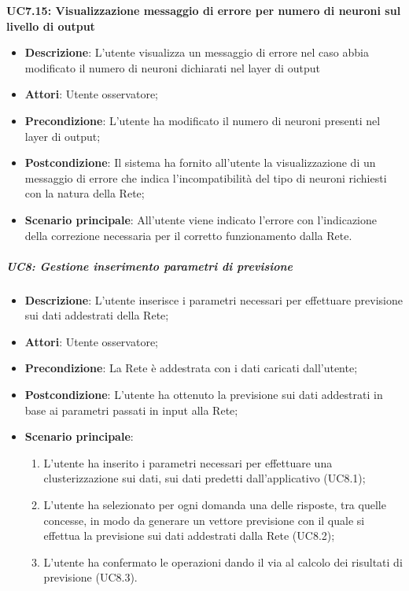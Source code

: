 \textbf{UC7.15: Visualizzazione messaggio di errore per numero di neuroni sul livello di output}\mbox{}
\label{UC7.15: Visualizzazione messaggio di errore per numero di neuroni sul livello di output}
\noindent
\begin{itemize}
\item \textbf{Descrizione}: L'utente visualizza un messaggio di errore nel caso abbia modificato il numero di neuroni dichiarati nel layer di output
\item \textbf{Attori}: Utente osservatore;
\item \textbf{Precondizione}: L'utente ha modificato il numero di neuroni presenti nel layer di output;
\item \textbf{Postcondizione}: Il sistema ha fornito all'utente la visualizzazione di un messaggio di errore che indica  l'incompatibilit\`a del tipo di neuroni richiesti con la natura della Rete;
\item \textbf{Scenario principale}: All'utente viene indicato l'errore con l'indicazione della correzione necessaria per il corretto funzionamento dalla Rete.
\end{itemize}

\subparagraph{UC8: Gestione inserimento parametri di previsione}\mbox{}
\label{UC8: Gestione inserimento parametri di previsione}
\noindent
\begin{itemize}
\item \textbf{Descrizione}: L'utente inserisce i parametri necessari per effettuare previsione sui dati addestrati della Rete;
\item \textbf{Attori}: Utente osservatore;
\item \textbf{Precondizione}: La Rete \`e addestrata con i dati caricati dall'utente;
\item \textbf{Postcondizione}: L'utente ha ottenuto la previsione sui dati addestrati in base ai parametri passati in input alla Rete;
\item \textbf{Scenario principale}:
\begin{enumerate}
\item  L'utente ha inserito i parametri necessari per effettuare una clusterizzazione sui dati, sui dati predetti dall'applicativo (UC8.1);
\item L'utente ha selezionato per ogni domanda una delle risposte, tra quelle concesse, in modo da generare un vettore previsione con il quale si effettua la previsione sui dati addestrati dalla Rete (UC8.2);
\item L'utente ha confermato le operazioni dando il via al calcolo dei risultati di previsione (UC8.3).
\end{enumerate}
\end{itemize}

